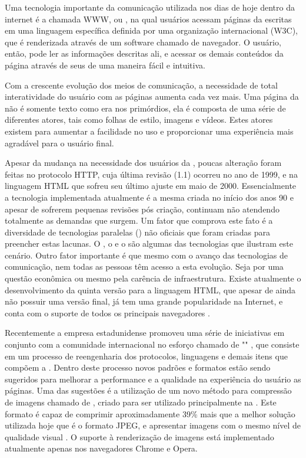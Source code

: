 \documentclass[espaco=simples,appendix=Name]{abnt}
\begin{document}
Uma tecnologia importante da comunicação utilizada nos dias de hoje dentro da internet é a chamada WWW, ou , na qual usuários acessam páginas da  escritas em uma linguagem específica definida por uma organização internacional (W3C), que é renderizada através de um software chamado de navegador. O usuário, então, pode ler as informações descritas ali, e acessar os demais conteúdos da página através de seus  de uma maneira fácil e intuitiva.

Com a crescente evolução dos meios de comunicação, a necessidade de total interatividade do usuário com as páginas aumenta cada vez mais. Uma página da  não é somente texto como era nos primórdios, ela é composta de uma série de diferentes atores, tais como folhas de estilo, imagens e vídeos. Estes atores existem para aumentar a facilidade no uso e proporcionar uma experiência mais agradável para o usuário final.

Apesar da mudança na necessidade dos usuários da , poucas alteração foram feitas no protocolo HTTP, cuja última revisão (1.1) ocorreu no ano de 1999, e na linguagem HTML que sofreu seu último ajuste em maio de 2000. Essencialmente a tecnologia implementada atualmente é a mesma criada no início dos anos 90 e apesar de sofrerem pequenas revisões pós criação, continuam não atendendo totalmente as demandas que surgem. Um fator que comprova este fato é a diversidade de tecnologias paralelas () não oficiais que foram criadas para preencher estas lacunas. O , o  e o  são algumas das tecnologias que ilustram este cenário. Outro fator importante é que mesmo com o avanço das tecnologias de comunicação, nem todas as pessoas têm acesso a esta evolução. Seja por uma questão econômica ou mesmo pela carência de infraestrutura. Existe atualmente o desenvolvimento da quinta versão para a linguagem HTML, que apesar de ainda não possuir uma versão final, já tem uma grande popularidade na Internet, e conta com o suporte de todos os principais navegadores \cite{W3schoolsHTML5}.

Recentemente a empresa estadunidense  promoveu uma série de iniciativas em conjunto com a comunidade internacional no esforço chamado de "" \cite{WebFaster}, que consiste em um processo de reengenharia dos protocolos, linguagens e demais itens que compõem a . Dentro deste processo novos padrões e formatos estão sendo sugeridos para melhorar a performance e a qualidade na experiência do usuário as páginas. Uma das sugestões é a utilização de um novo método para compressão de imagens chamado de , criado para ser utilizado principalmente na . Este formato é capaz de comprimir aproximadamente 39\% mais que a melhor solução utilizada hoje que é o formato JPEG, e apresentar imagens com o mesmo nível de qualidade visual \cite{WebPStudy}. O suporte à renderização de imagens  está implementado atualmente apenas nos navegadores Chrome e Opera.
\end{document}
